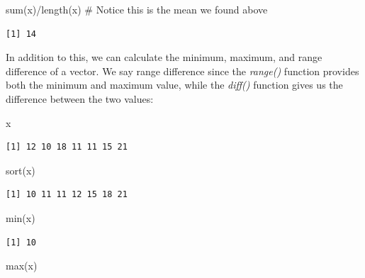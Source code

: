 \documentclass[
  letterpaper,
  DIV=11,
  numbers=noendperiod]{scrreprt}
\newenvironment{Shaded}{\begin{snugshade}}{\end{snugshade}}
\newcommand{\CommentTok}[1]{\textcolor[rgb]{0.37,0.37,0.37}{#1}}
\newcommand{\FunctionTok}[1]{\textcolor[rgb]{0.28,0.35,0.67}{#1}}
\newcommand{\NormalTok}[1]{\textcolor[rgb]{0.00,0.23,0.31}{#1}}
\newcommand{\SpecialCharTok}[1]{\textcolor[rgb]{0.37,0.37,0.37}{#1}}
\begin{document}
\begin{Shaded}
\begin{Highlighting}[]
\FunctionTok{sum}\NormalTok{(x)}\SpecialCharTok{/}\FunctionTok{length}\NormalTok{(x) }\CommentTok{\# Notice this is the mean we found above}
\end{Highlighting}
\end{Shaded}

\begin{verbatim}
[1] 14
\end{verbatim}

In addition to this, we can calculate the minimum, maximum, and range
difference of a vector. We say range difference since the \emph{range()}
function provides both the minimum and maximum value, while the
\emph{diff()} function gives us the difference between the two values:

\begin{Shaded}
\begin{Highlighting}[]
\NormalTok{x}
\end{Highlighting}
\end{Shaded}

\begin{verbatim}
[1] 12 10 18 11 11 15 21
\end{verbatim}

\begin{Shaded}
\begin{Highlighting}[]
\FunctionTok{sort}\NormalTok{(x)}
\end{Highlighting}
\end{Shaded}

\begin{verbatim}
[1] 10 11 11 12 15 18 21
\end{verbatim}

\begin{Shaded}
\begin{Highlighting}[]
\FunctionTok{min}\NormalTok{(x)}
\end{Highlighting}
\end{Shaded}

\begin{verbatim}
[1] 10
\end{verbatim}

\begin{Shaded}
\begin{Highlighting}[]
\FunctionTok{max}\NormalTok{(x)}
\end{Highlighting}
\end{Shaded}
\end{document}
